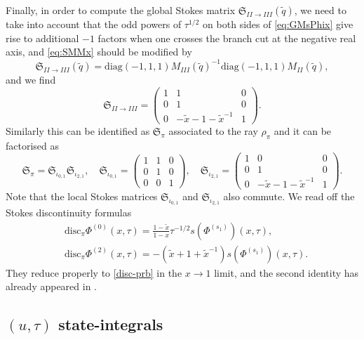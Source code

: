 \documentclass[12pt,reqno]{amsart}
\theoremstyle{definition}
\def\tq{\tilde{q}}
\def\tx{\tilde{x}}
\def\tx{\tilde{x}}
\def\diag{\mathrm{diag}}
\def\mf{\mathfrak}
\begin{document}
Finally, in order to compute the global Stokes matrix
$\mf{S}_{II\rightarrow III}(\tq)$, we need to take into account that
the odd powers of $\tau^{1/2}$ on both sides of \eqref{eq:GMsPhix}
give rise to additional $-1$ factors when one crosses the branch cut at
the negative real axis, and \eqref{eq:SMMx} should be modified by
\begin{equation}
  \mf{S}_{II\rightarrow III}(\tq) = \diag(-1,1,1)
  M_{III}(\tq)^{-1}\diag(-1,1,1) M_{II}(\tq),
\end{equation}
and we find 
\begin{equation}
  \mf{S}_{II\rightarrow III} = 
  \begin{pmatrix}
    1&1&0\\
    0&1&0\\
    0&-\tx-1-\tx^{-1}&1
  \end{pmatrix}.
\end{equation}
Similarly this can be identified as $\mf{S}_{\pi}$ associated to the
ray $\rho_{\pi}$ and it can be factorised as 
\begin{equation}
  \mf{S}_{\pi} = \mf{S}_{\iota_{0,1}}\mf{S}_{\iota_{2,1}},\quad
  \mf{S}_{\iota_{0,1}} =
  \begin{pmatrix}
    1&1&0\\
    0&1&0\\
    0&0&1
  \end{pmatrix},\quad
  \mf{S}_{\iota_{2,1}} =
  \begin{pmatrix}
    1&0&0\\
    0&1&0\\
    0&-\tx-1-\tx^{-1}&1
  \end{pmatrix}.
\end{equation}
Note that the local Stokes matrices $\mf{S}_{\iota_{0,1}}$ and
$\mf{S}_{\iota_{2,1}}$ also commute.  We read off the Stokes
discontinuity formulas 
\begin{align}
  &\text{disc}_\pi \Phi^{(0)}(x,\tau) =
    \frac{1-\tx}{1-x}\tau^{-1/2}s(\Phi^{(s_1)})(x,\tau), \\
  &\text{disc}_\pi \Phi^{(2)}(x,\tau) = -(\tx+1+\tx^{-1})s(\Phi^{(s_1)})(x,\tau).
\end{align}
They reduce properly to \eqref{disc-prb} in the $x\rightarrow 1$
limit, and the second identity has already appeared in
\cite{GGM:resurgent}.

\subsection{$(u,\tau)$ state-integrals}
\label{sub.41statex}
\end{document}
